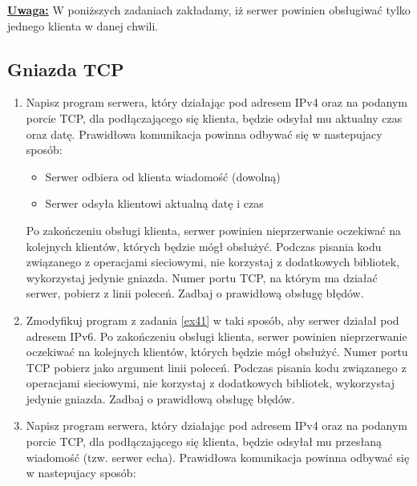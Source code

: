 \documentclass{article}
\begin{document}
\noindent \textbf{\underline{Uwaga:}} W poniższych zadaniach zakładamy, iż serwer powinien obsługiwać tylko jednego klienta w danej chwili.

\subsection*{Gniazda TCP}

\begin{enumerate}[label=\textbf{4.\arabic*}]\setlength{\itemsep}{1em}

\item \label{ex41} Napisz program serwera, który działając pod adresem IPv4 oraz na podanym porcie TCP, dla podłączającego się klienta, będzie odsyłał mu aktualny czas oraz datę. Prawidłowa komunikacja powinna odbywać się w nastepujacy sposób: 

\begin{itemize}
\item Serwer odbiera od klienta wiadomość (dowolną)
\item Serwer odsyła klientowi aktualną datę i czas
\end{itemize}

\noindent Po zakończeniu obsługi klienta, serwer powinien nieprzerwanie oczekiwać na kolejnych klientów, których będzie mógł obsłużyć. Podczas pisania kodu związanego z operacjami sieciowymi, nie korzystaj z dodatkowych bibliotek, wykorzystaj jedynie gniazda. Numer portu TCP, na którym ma działać serwer, pobierz z linii poleceń. Zadbaj o prawidłową obsługę błędów. 

\item Zmodyfikuj program z zadania \ref{ex41} w taki sposób,  aby serwer działał pod adresem IPv6. Po zakończeniu obsługi klienta, serwer powinien nieprzerwanie oczekiwać na kolejnych klientów, których będzie mógł obsłużyć. Numer portu TCP pobierz jako argument linii poleceń. Podczas pisania kodu związanego z operacjami sieciowymi, nie korzystaj z dodatkowych bibliotek, wykorzystaj jedynie gniazda. Zadbaj o prawidłową obsługę błędów. 

\item \label{ex42} Napisz program serwera, który działając  pod adresem IPv4 oraz na podanym porcie TCP, dla podłączającego się klienta, będzie odsyłał mu przesłaną wiadomość (tzw. serwer echa). Prawidłowa komunikacja powinna odbywać się w nastepujacy sposób:


\end{enumerate}
\end{document}
